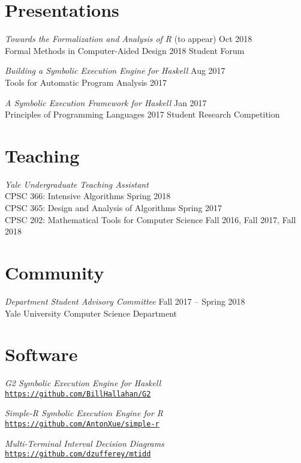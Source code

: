\documentclass[margin]{res}
\begin{document}
\begin{resume}
\section{Presentations}
\textit{Towards the Formalization and Analysis of R} (to appear)
  \hfill Oct 2018 \\
Formal Methods in Computer-Aided Design 2018 Student Forum

\textit{Building a Symbolic Execution Engine for Haskell}
  \hfill Aug 2017 \\
Tools for Automatic Program Analysis 2017

\textit{A Symbolic Execution Framework for Haskell}
  \hfill Jan 2017 \\
Principles of Programming Languages 2017 Student Research Competition

\section{Teaching}
\textit{Yale Undergraduate Teaching Assistant} \\
  CPSC 366: Intensive Algorithms
    \hfill Spring 2018 \\
  CPSC 365: Design and Analysis of Algorithms
    \hfill Spring 2017 \\
  CPSC 202: Mathematical Tools for Computer Science
    \hfill Fall 2016, Fall 2017, Fall 2018 \\

\section{Community}
\textit{Department Student Advisory Committee}
  \hfill Fall 2017 -- Spring 2018 \\
Yale University Computer Science Department

\section{Software}
\textit{G2 Symbolic Execution Engine for Haskell} \\
\href{https://github.com/BillHallahan/G2}
     {\texttt{https://github.com/BillHallahan/G2}}

\textit{Simple-R Symbolic Execution Engine for R} \\
\href{https://github.com/AntonXue/simple-r}
     {\texttt{https://github.com/AntonXue/simple-r}}

\textit{Multi-Terminal Interval Decision Diagrams} \\
\href{https://github.com/dzufferey/mtidd}
     {\texttt{https://github.com/dzufferey/mtidd}}


\end{resume}
\end{document}
